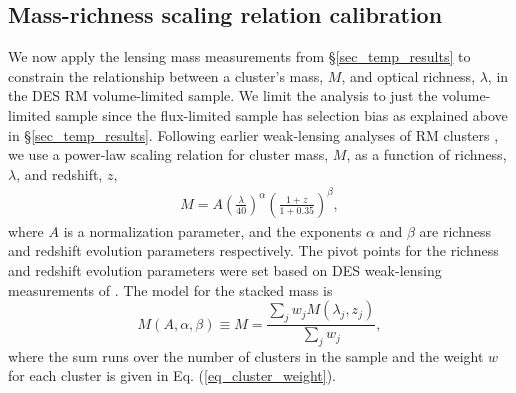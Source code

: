 \subsection{Mass-richness \ML{} scaling relation calibration}\label{sec_ML_scaling}

We now apply the lensing mass measurements from \S\ref{sec_temp_results} to constrain the relationship between a cluster's mass, $M$, and optical richness, $\lambda$, in the DES RM \whichyear{} volume-limited sample. 
We limit the analysis to just the volume-limited sample since the flux-limited sample has selection bias as explained above in \S\ref{sec_temp_results}.
Following earlier weak-lensing analyses of RM clusters \citep{simet18, melchoir17, mcclintock18}, we use a power-law scaling relation for cluster mass, $M$, as a function of richness, $\lambda$, and redshift, $z$,
\begin{eqnarray}
M = A \left(\frac{\lambda}{40}\right)^{\alpha} \left(\frac{1+z}{1+0.35}\right)^{\beta},
\label{eq_ML}
 \end{eqnarray}
 where $A$ is a normalization parameter, and the exponents $\alpha$ and $\beta$ are richness and redshift evolution parameters respectively. 
The pivot points for the richness and redshift evolution parameters were set based on DES weak-lensing measurements of \cite{mcclintock18}.
The model for the stacked mass is 
\begin{equation}
M(A, \alpha, \beta) \equiv M = \frac{\sum_j w_j M(\lambda_{j}, z_{j})}{\sum_j w_j}, 
\label{eq_model_ML}
\end{equation}
where the sum runs over the number of clusters in the sample and the weight $w$ for each cluster is given in Eq. (\ref{eq_cluster_weight}).
